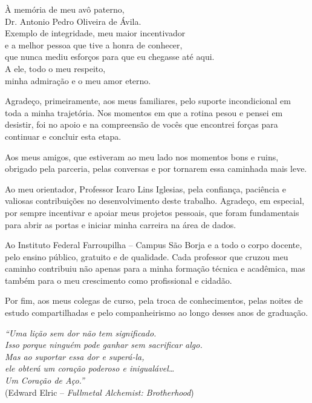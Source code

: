 \begin{dedicatoria}
	\vspace*{\fill}
	\noindent
    \begin{flushright}
		À memória de meu avô paterno, \\
Dr. Antonio Pedro Oliveira de Ávila. \\
Exemplo de integridade, meu maior incentivador \\
e a melhor pessoa que tive a honra de conhecer, \\
que nunca mediu esforços para que eu chegasse até aqui. \\
A ele, todo o meu respeito, \\
minha admiração e o meu amor eterno.
	\end{flushright}
\end{dedicatoria}

\begin{agradecimentos}
	Agradeço, primeiramente, aos meus familiares, pelo suporte incondicional em toda a minha trajetória. Nos momentos em que a rotina pesou e pensei em desistir, foi no apoio e na compreensão de vocês que encontrei forças para continuar e concluir esta etapa.

Aos meus amigos, que estiveram ao meu lado nos momentos bons e ruins, obrigado pela parceria, pelas conversas e por tornarem essa caminhada mais leve.

Ao meu orientador, Professor Icaro Lins Iglesias, pela confiança, paciência e valiosas contribuições no desenvolvimento deste trabalho. Agradeço, em especial, por sempre incentivar e apoiar meus projetos pessoais, que foram fundamentais para abrir as portas e iniciar minha carreira na área de dados.

Ao Instituto Federal Farroupilha – Campus São Borja e a todo o corpo docente, pelo ensino público, gratuito e de qualidade. Cada professor que cruzou meu caminho contribuiu não apenas para a minha formação técnica e acadêmica, mas também para o meu crescimento como profissional e cidadão.

Por fim, aos meus colegas de curso, pela troca de conhecimentos, pelas noites de estudo compartilhadas e pelo companheirismo ao longo desses anos de graduação.
\end{agradecimentos}

\begin{epigrafe}
	\vspace*{\fill}
	\begin{flushright}
		\textit{``Uma lição sem dor não tem significado.\\
			Isso porque ninguém pode ganhar sem sacrificar algo.\\
			Mas ao suportar essa dor e superá-la,\\
			ele obterá um coração poderoso e inigualável\ldots\\
			Um Coração de Aço.''}\\
		(Edward Elric -- \textit{Fullmetal Alchemist: Brotherhood})
	\end{flushright}
\end{epigrafe}

